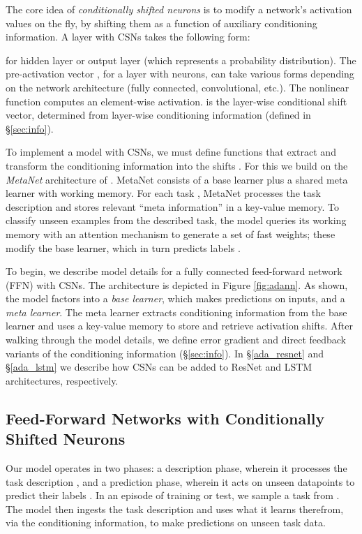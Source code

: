 \documentclass{article}
\begin{document}
The core idea of \textit{conditionally shifted neurons} is to modify a network's activation values on the fly, by shifting them as a function of auxiliary conditioning information.
A layer with CSNs takes the following form:

for hidden layer  or output layer  (which represents a probability distribution). The pre-activation vector , for a layer with  neurons, can take various forms depending on the network architecture (fully connected, convolutional, etc.).
The nonlinear function  computes an element-wise activation.
 is the layer-wise conditional shift vector, determined from layer-wise conditioning information  (defined in \S\ref{sec:info}).

To implement a model with CSNs, we must define functions that extract and transform the conditioning information  into the shifts .
For this we build on the \emph{MetaNet} architecture of \citet{pmlr-v70-munkhdalai17a}.
MetaNet consists of a base learner plus a shared meta learner with working memory. For each task , MetaNet processes the task description  and stores relevant ``meta information'' in a key-value memory.
To classify unseen examples  from the described task, the model queries its working memory with an attention mechanism to generate a set of fast weights; these modify the base learner, which in turn predicts labels .

To begin, we describe model details for a fully connected feed-forward network (FFN) with CSNs.
The architecture is depicted in Figure \ref{fig:adann}.
As shown, the model factors into a \emph{base learner}, which makes predictions on inputs, and a \emph{meta learner}. The meta learner extracts conditioning information from the base learner and uses a key-value memory to store and retrieve activation shifts.
After walking through the model details, we define error gradient and direct feedback variants of the conditioning information  (\S\ref{sec:info}).
In \S\ref{ada_resnet} and \S\ref{ada_lstm} we describe how CSNs can be added to ResNet and LSTM architectures, respectively.



\subsection{Feed-Forward Networks with Conditionally Shifted Neurons}

Our model operates in two phases: a description phase, wherein it processes the task description , and a prediction phase, wherein it acts on unseen datapoints  to predict their labels .
In an episode of training or test, we sample a task from . The model then ingests the task description and uses what it learns therefrom, via the conditioning information, to make predictions on unseen task data.
\end{document}
